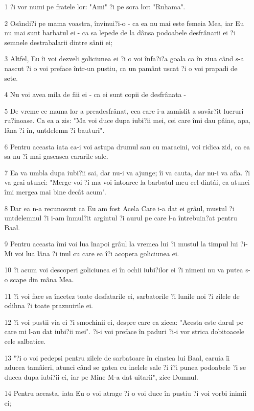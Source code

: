 \par 1 ?i vor numi pe fratele lor: "Ami" ?i pe sora lor: "Ruhama".
\par 2 Osândi?i pe mama voastra, învinui?i-o - ca ea nu mai este femeia Mea, iar Eu nu mai sunt barbatul ei - ca sa lepede de la dânsa podoabele desfrânarii ei ?i semnele destrabalarii dintre sânii ei;
\par 3 Altfel, Eu îi voi dezveli goliciunea ei ?i o voi înfa?i?a goala ca în ziua când s-a nascut ?i o voi preface într-un pustiu, ca un pamânt uscat ?i o voi prapadi de sete.
\par 4 Nu voi avea mila de fiii ei - ca ei sunt copii de desfrânata -
\par 5 De vreme ce mama lor a preadesfrânat, cea care i-a zamislit a savâr?it lucruri ru?inoase. Ca ea a zis: "Ma voi duce dupa iubi?ii mei, cei care îmi dau pâine, apa, lâna ?i în, untdelemn ?i bauturi".
\par 6 Pentru aceasta iata ca-i voi astupa drumul sau cu maracini, voi ridica zid, ca ea sa nu-?i mai gaseasca cararile sale.
\par 7 Ea va umbla dupa iubi?ii sai, dar nu-i va ajunge; îi va cauta, dar nu-i va afla. ?i va grai atunci: "Merge-voi ?i ma voi întoarce la barbatul meu cel dintâi, ca atunci îmi mergea mai bine decât acum".
\par 8 Dar ea n-a recunoscut ca Eu am fost Acela Care i-a dat ei grâul, mustul ?i untdelemnul ?i i-am înmul?it argintul ?i aurul pe care l-a întrebuin?at pentru Baal.
\par 9 Pentru aceasta îmi voi lua înapoi grâul la vremea lui ?i mustul la timpul lui ?i-Mi voi lua lâna ?i inul cu care ea î?i acopera goliciunea ei.
\par 10 ?i acum voi descoperi goliciunea ei în ochii iubi?ilor ei ?i nimeni nu va putea s-o scape din mâna Mea.
\par 11 ?i voi face sa încetez toate desfatarile ei, sarbatorile ?i lunile noi ?i zilele de odihna ?i toate praznuirile ei.
\par 12 ?i voi pustii via ei ?i smochinii ei, despre care ea zicea: "Acesta este darul pe care mi l-au dat iubi?ii mei". ?i-i voi preface în paduri ?i-i vor strica dobitoacele cele salbatice.
\par 13 "?i o voi pedepsi pentru zilele de sarbatoare în cinstea lui Baal, caruia îi aducea tamâieri, atunci când se gatea cu inelele sale ?i î?i punea podoabele ?i se ducea dupa iubi?ii ei, iar pe Mine M-a dat uitarii", zice Domnul.
\par 14 Pentru aceasta, iata Eu o voi atrage ?i o voi duce în pustiu ?i voi vorbi inimii ei;
